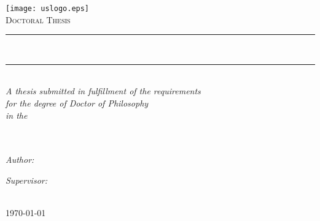 \begin{titlepage}
	\begin{center}
		\texttt{[image: uslogo.eps]} \\ \medskip
		\vspace*{.05\textheight}
		\textsc{\Large Doctoral Thesis}\\%

		\rule{\linewidth}{.6pt}\\[0.4cm]
		{\huge \myTitle \par}\vspace{0.4cm} %
		\rule{\linewidth}{.6pt}\\[1cm] 

		\large \textit{A thesis submitted in fulfillment of the requirements\\ for the degree of Doctor of Philosophy}\\[0.5cm] %
		\textit{in the}\\[0.5cm]
		\myDepartment\\ \myFaculty\\[1cm]
		
		\begin{minipage}{.45\linewidth}
			\begin{flushleft} %
			\emph{Author:}\\
			{\myName} %
			\end{flushleft}
		\end{minipage}
		\hfill
		\begin{minipage}{.45\linewidth}
			\begin{flushright} %
			\emph{Supervisor:} \\
			{\mySupervisor}%
			\end{flushright}
		\end{minipage}\\ [0.5cm]

		{\large \today}\\%
		 
		\vfill
	\end{center}
\end{titlepage}